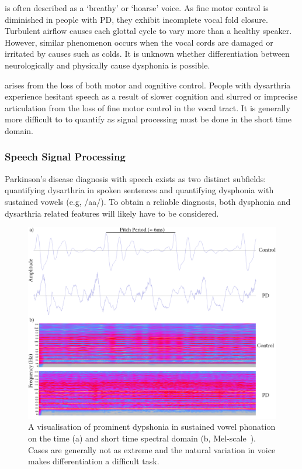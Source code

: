 \documentclass[12pt, twoside]{book}
\renewcommand\emph[1]{\textit{\color{USred}{#1}}}
\begin{document}
\emph{Dysphonia} is often described as a `breathy' or `hoarse' voice. As fine motor control is diminished in people with PD, they exhibit incomplete vocal fold closure. Turbulent airflow causes each glottal cycle to vary more than a healthy speaker. However, similar phenomenon occurs when the vocal cords are damaged or irritated by causes such as colds. It is unknown whether differentiation between neurologically and physically cause dysphonia is possible.  

\emph{Dysarthria} arises from the loss of both motor and cognitive control. People with dysarthria experience hesitant speech as a result of slower cognition and slurred or imprecise articulation from the loss of fine motor control in the vocal tract. It is generally more difficult to to quantify as signal processing must be done in the short time domain. 


\subsubsection{Speech Signal Processing}
Parkinson's disease diagnosis with speech exists as two distinct subfields: quantifying dysarthria in spoken sentences and quantifying dysphonia with sustained vowels (e.g, /aa/). To obtain a reliable diagnosis, both dysphonia and dysarthria related features will likely have to be considered.


\begin{figure}[h]
	\label{spectrogram}
	\centering\centerline{\includegraphics[width=1.2\linewidth]{timespectrogram.png}}
	\caption{A visualisation of prominent dypshonia in sustained vowel phonation on the time (a) and short time spectral domain (b, Mel-scale~\cite{mfscale}). Cases are generally not as extreme and the natural variation in voice makes differentiation a difficult task.}
\end{figure}
\end{document}
